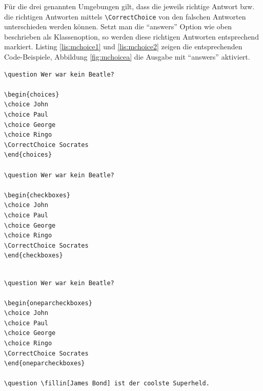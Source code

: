 Für die drei genannten Umgebungen gilt, dass die jeweils richtige Antwort bzw. die richtigen Antworten mittels \texttt{\textbackslash CorrectChoice} von den falschen Antworten unterschieden werden können. Setzt man die \enquote{answers} Option wie oben beschrieben als Klassenoption, so werden diese richtigen Antworten entsprechend markiert. Listing \ref{lis:mchoice1} und \ref{lis:mchoice2} zeigen die entsprechenden Code-Beispiele, Abbildung \ref{fig:mchoicea} die Ausgabe mit \enquote{answers} aktiviert.

\begin{lstlisting}[caption={Multiple-Choice Aufgaben 1},label={lis:mchoice1}]
\question Wer war kein Beatle?

\begin{choices}
\choice John
\choice Paul
\choice George
\choice Ringo
\CorrectChoice Socrates
\end{choices}

\question Wer war kein Beatle?

\begin{checkboxes}
\choice John
\choice Paul
\choice George
\choice Ringo
\CorrectChoice Socrates
\end{checkboxes}
\end{lstlisting}

\clearpage

\begin{lstlisting}[caption={Multiple-Choice Aufgaben 2},label={lis:mchoice2}]

\question Wer war kein Beatle?

\begin{oneparcheckboxes}
\choice John
\choice Paul
\choice George
\choice Ringo
\CorrectChoice Socrates
\end{oneparcheckboxes}

\question \fillin[James Bond] ist der coolste Superheld.

\end{lstlisting}


